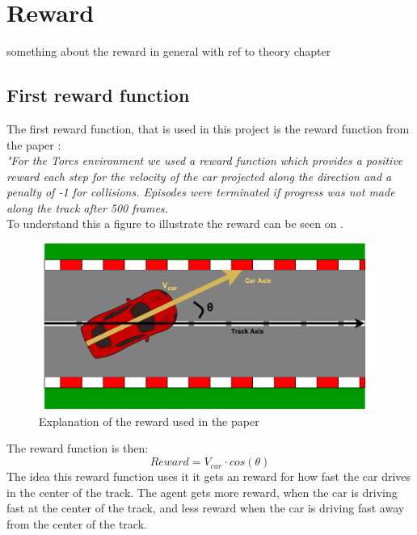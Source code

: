 \section{Reward}
something about the reward in general with ref to theory chapter

\subsection*{First reward function}
The first reward function, that is used in this project is the reward function from the paper \cite{DBLP:journals/corr/LillicrapHPHETS15}: \\
\textit{"For the Torcs environment we used a reward function which provides a positive reward each step for the velocity of the car projected along the direction and a penalty of -1 for collisions. Episodes were terminated if progress was not made along the track after 500 frames.}\\
To understand this a figure to illustrate the reward can be seen on .

\begin{figure}[H]
	\centering
	\includegraphics[width=1\textwidth]{Figures/Result/Reward_paper.pdf}
	\caption{Explanation of the reward used in the paper \cite{DBLP:journals/corr/LillicrapHPHETS15} }
	\label{fig:Reward_paper}
\end{figure}

The reward function is then:
\begin{equation}
Reward = V_{car} \cdot cos(\theta) 
\end{equation}
The idea this reward function uses it it gets an reward for how fast the car drives in the center of the track. The agent gets more reward, when the car is driving fast at the center of the track, and less reward when the car is driving fast away from the center of the track. 

